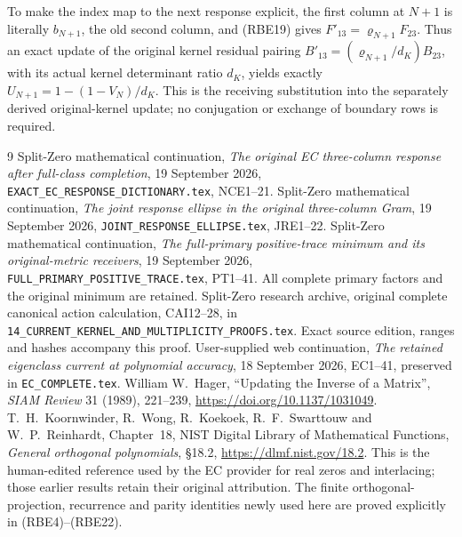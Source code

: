 \documentclass[11pt]{article}
\begin{document}
To make the index map to the next response explicit, the first
column at \(N+1\) is literally \(b_{N+1}\), the old second
column, and (RBE19) gives \(F'_{13}=\varrho_{N+1}F_{23}\).
Thus an exact update of the original kernel residual pairing
\(B'_{13}=(\varrho_{N+1}/d_K)B_{23}\), with its actual
kernel determinant ratio \(d_K\), yields exactly
\(U_{N+1}=1-(1-V_N)/d_K\). This is the receiving substitution
into the separately derived original-kernel update; no conjugation
or exchange of boundary rows is required.

\begin{thebibliography}{9}
 Split-Zero mathematical continuation,
\emph{The original EC three-column response after full-class completion},
19 September 2026, \texttt{EXACT\_EC\_RESPONSE\_DICTIONARY.tex}, NCE1--21.
 Split-Zero mathematical continuation,
\emph{The joint response ellipse in the original three-column Gram},
19 September 2026, \texttt{JOINT\_RESPONSE\_ELLIPSE.tex}, JRE1--22.
 Split-Zero mathematical continuation,
\emph{The full-primary positive-trace minimum and its original-metric
receivers}, 19 September 2026, \texttt{FULL\_PRIMARY\_POSITIVE\_TRACE.tex},
PT1--41. All complete primary factors and the original minimum are retained.
 Split-Zero research archive, original complete canonical
action calculation, CAI12--28, in
\texttt{14\_CURRENT\_KERNEL\_AND\_MULTIPLICITY\_PROOFS.tex}.
Exact source edition, ranges and hashes accompany this proof.
 User-supplied web continuation,
\emph{The retained eigenclass current at polynomial accuracy},
18 September 2026, EC1--41, preserved in \texttt{EC\_COMPLETE.tex}.
 William W.~Hager, ``Updating the Inverse of a Matrix'',
\emph{SIAM Review} 31 (1989), 221--239,
\url{https://doi.org/10.1137/1031049}.
 T.~H.~Koornwinder, R.~Wong, R.~Koekoek,
R.~F.~Swarttouw and W.~P.~Reinhardt, Chapter~18,
NIST Digital Library of Mathematical Functions,
\emph{General orthogonal polynomials}, \S18.2,
\url{https://dlmf.nist.gov/18.2}. This is the human-edited reference
used by the EC provider for real zeros and interlacing; those earlier
results retain their original attribution. The finite orthogonal-
projection, recurrence and parity identities newly used here are
proved explicitly in (RBE4)--(RBE22).
\end{thebibliography}
\end{document}
